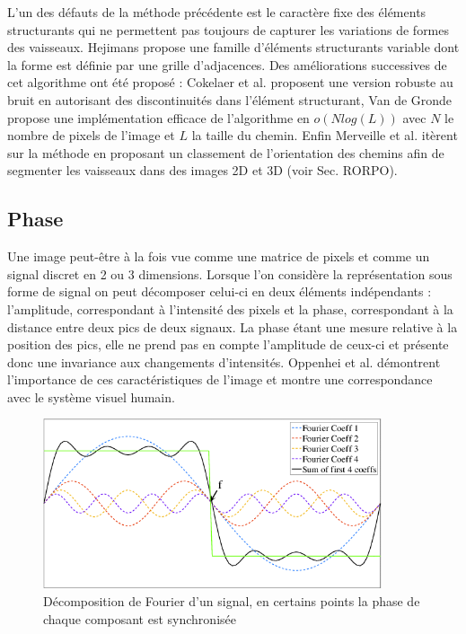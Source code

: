 L'un des défauts de la méthode précédente est le caractère fixe des éléments structurants qui ne permettent pas toujours de capturer les variations de formes des vaisseaux. Hejimans \cite{Heijmans2005_path_opening} propose une famille d'éléments structurants variable dont la forme est définie par une grille d'adjacences. Des améliorations successives de cet algorithme ont été proposé : Cokelaer et al. \cite{Cokelaer2012_efficient_path_opening} proposent une version robuste au bruit en autorisant des discontinuités dans l'élément structurant, Van de Gronde \cite{Gronde2015_fast_path_opening} propose une implémentation efficace de l'algorithme en $o( N log ( L ))$ avec $N$ le nombre de pixels de l'image et $L$ la taille du chemin. Enfin Merveille et al. \cite{Merveille2018_curvilinear} itèrent sur la méthode en proposant un classement de l'orientation des chemins afin de segmenter les vaisseaux dans des images 2D et 3D (voir Sec. RORPO). 


\subsection{Phase}
\label{sec:EA:rehaussement:Phase}

Une image peut-être à la fois vue comme une matrice de pixels et comme un signal discret en 2 ou 3 dimensions. Lorsque l'on considère la représentation sous forme de signal on peut décomposer celui-ci en deux éléments indépendants : l'amplitude, correspondant à l'intensité des pixels et la phase, correspondant à la distance entre deux pics de deux signaux. La phase étant une mesure relative à la position des pics, elle ne prend pas en compte l'amplitude de ceux-ci et présente donc une invariance aux changements d'intensités. Oppenhei et al. \cite{Oppenheim1981_phase_importance} démontrent l'importance de ces caractéristiques de l'image et montre une correspondance avec le système visuel humain. 

\begin{figure}[h]
  \centering
  \includegraphics[height=5cm]{Images/PC_decomposition.png}
  \caption{Décomposition de Fourier d'un signal, en certains points la phase de chaque composant est synchronisée}
  \label{fig:phase congruency}
\end{figure}

